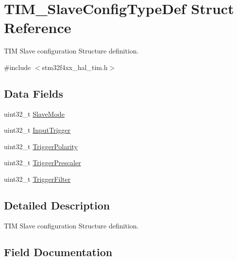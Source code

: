 \hypertarget{struct_t_i_m___slave_config_type_def}{}\section{T\+I\+M\+\_\+\+Slave\+Config\+Type\+Def Struct Reference}
\label{struct_t_i_m___slave_config_type_def}


T\+IM Slave configuration Structure definition.  




{\ttfamily \#include $<$stm32f4xx\+\_\+hal\+\_\+tim.\+h$>$}

\subsection*{Data Fields}
\begin{DoxyCompactItemize}
\item 
uint32\+\_\+t \hyperlink{struct_t_i_m___slave_config_type_def_a2792de155698128ade1e505618c1bc43}{Slave\+Mode}
\item 
uint32\+\_\+t \hyperlink{struct_t_i_m___slave_config_type_def_a82efdad1e2ed9edbd4c895987ebfe0f7}{Input\+Trigger}
\item 
uint32\+\_\+t \hyperlink{struct_t_i_m___slave_config_type_def_afa8fa1801ef5e13115732a495ef11165}{Trigger\+Polarity}
\item 
uint32\+\_\+t \hyperlink{struct_t_i_m___slave_config_type_def_a57be6d41d77a968f1daeac7b65b1ab4c}{Trigger\+Prescaler}
\item 
uint32\+\_\+t \hyperlink{struct_t_i_m___slave_config_type_def_a07d28f704576a41e37bbb7412e0fba60}{Trigger\+Filter}
\end{DoxyCompactItemize}


\subsection{Detailed Description}
T\+IM Slave configuration Structure definition. 

\subsection{Field Documentation}
\mbox{\label{struct_t_i_m___slave_config_type_def_a82efdad1e2ed9edbd4c895987ebfe0f7}} 
